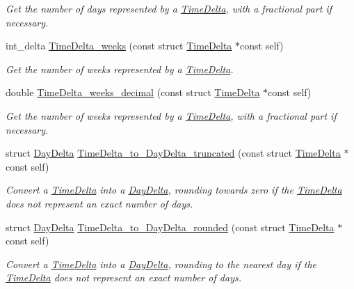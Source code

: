\begin{DoxyCompactItemize}
\begin{DoxyCompactList}\small\item\em \-Get the number of days represented by a \hyperlink{structTimeDelta}{\-Time\-Delta}, with a fractional part if necessary. \end{DoxyCompactList}\item 
int\-\_\-delta \hyperlink{time-delta_8h_a162a7cec10d82c6cf922a32eb22f58d1}{\-Time\-Delta\-\_\-weeks} (const struct \hyperlink{structTimeDelta}{\-Time\-Delta} $\ast$const self)
\begin{DoxyCompactList}\small\item\em \-Get the number of weeks represented by a \hyperlink{structTimeDelta}{\-Time\-Delta}. \end{DoxyCompactList}\item 
double \hyperlink{time-delta_8h_a1cf0e7d811b1fd0dd4c50c26d110f30a}{\-Time\-Delta\-\_\-weeks\-\_\-decimal} (const struct \hyperlink{structTimeDelta}{\-Time\-Delta} $\ast$const self)
\begin{DoxyCompactList}\small\item\em \-Get the number of weeks represented by a \hyperlink{structTimeDelta}{\-Time\-Delta}, with a fractional part if necessary. \end{DoxyCompactList}\item 
struct \hyperlink{structDayDelta}{\-Day\-Delta} \hyperlink{time-delta_8h_abd089246702cb29504de0fe4e3057ad2}{\-Time\-Delta\-\_\-to\-\_\-\-Day\-Delta\-\_\-truncated} (const struct \hyperlink{structTimeDelta}{\-Time\-Delta} $\ast$const self)
\begin{DoxyCompactList}\small\item\em \-Convert a \hyperlink{structTimeDelta}{\-Time\-Delta} into a \hyperlink{structDayDelta}{\-Day\-Delta}, rounding towards zero if the \hyperlink{structTimeDelta}{\-Time\-Delta} does not represent an exact number of days. \end{DoxyCompactList}\item 
struct \hyperlink{structDayDelta}{\-Day\-Delta} \hyperlink{time-delta_8h_a7bbf766c60002c0835d0a81dfdfa7918}{\-Time\-Delta\-\_\-to\-\_\-\-Day\-Delta\-\_\-rounded} (const struct \hyperlink{structTimeDelta}{\-Time\-Delta} $\ast$const self)
\begin{DoxyCompactList}\small\item\em \-Convert a \hyperlink{structTimeDelta}{\-Time\-Delta} into a \hyperlink{structDayDelta}{\-Day\-Delta}, rounding to the nearest day if the \hyperlink{structTimeDelta}{\-Time\-Delta} does not represent an exact number of days. \end{DoxyCompactList}\item 

\end{DoxyCompactItemize}
